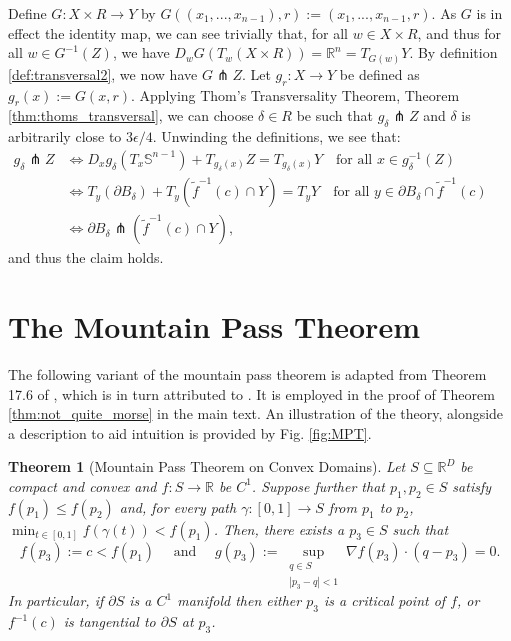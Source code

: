 \documentclass[11pt]{article}
\newcommand{\1}{\mathbf{1}}
\newtheorem{thm}{Theorem}%
\theoremstyle{definition}
\theoremstyle{remark}
\begin{document}
Define $G:X\times R \rightarrow Y$ by $G((x_1,...,x_{n-1}),r):=(x_1,...,x_{n-1},r)$. As $G$ is in effect the identity map, we can see trivially that, for all $w \in X\times R$, and thus for all $w \in G^{-1}(Z)$, we have $D_w G\left(T_w (X \times R)\right)=\mathbb{R}^n=T_{G(w)} Y$. By definition \ref{def:transversal2}, we now have $G\pitchfork Z$. Let $g_r:X\rightarrow Y$ be defined as $g_r(x):=G(x,r)$. Applying Thom's Transversality Theorem, Theorem \ref{thm:thoms_transversal}, we can choose $\delta\in R$ be such that $g_\delta \pitchfork Z$ and $\delta$ is arbitrarily close to $3\epsilon/4$. Unwinding the definitions, we see that:
\begin{equation}\nonumber
\begin{aligned}
g_\delta \pitchfork Z 
&\iff D_x g_\delta(T_x \mathbb{S}^{n-1}) + T_{g_\delta(x)} Z = T_{g_\delta(x)} Y \quad \text{for all } x \in g_\delta^{-1}(Z)
\quad && \\
&\iff T_y(\partial B_\delta) + T_y(\tilde{f}^{-1}(c) \cap Y) = T_y Y 
\quad  \text{for all } y \in \partial B_\delta \cap \tilde{f}^{-1}(c)  && \\
&\iff \partial B_\delta \pitchfork \left( \tilde{f}^{-1}(c) \cap Y \right),
\quad && 
\end{aligned}
\end{equation}
and thus the claim holds.


\section{The Mountain Pass Theorem}\label{app:mpt}


The following variant of the mountain pass theorem is adapted from Theorem 17.6 of \cite{Jabri_2003}, which is in turn attributed to \cite{convex_mpt}. It is employed in the proof of Theorem \ref{thm:not_quite_morse} in the main text. An illustration of the theory, alongside a description to aid intuition is provided by Fig. \ref{fig:MPT}. 

\begin{mdframed}
    \begin{thm}[Mountain Pass Theorem on Convex Domains]\label{thm:mpt} Let $S\subseteq\mathbb{R}^D$ be compact and convex and $f:S\rightarrow \mathbb{R}$ be $C^1$. Suppose further that $p_1, p_2 \in S$ satisfy $f(p_1) \leq f(p_2)$ and, for every path $\gamma:[0,1]\rightarrow S$ from $p_1$ to $p_2$, $\min_{t \in [0,1]} f(\gamma(t)) < f(p_1)$. Then, there exists a $p_3 \in S$ such that
\begin{equation}\nonumber
    f(p_3):= c < f(p_1)\quad  \text{ and }\quad g(p_3) := \sup_{\substack{q \in S\\ |p_3-q|<1}} \nabla f(p_3)\cdot (q-p_3) = 0 .
\end{equation}
In particular, if $\partial S$ is a $C^1$ manifold then either $p_3$ is a critical point of $f$, or $f^{-1}(c)$ is tangential to $\partial S$ at $p_3$.
    \end{thm}
\end{mdframed}
\end{document}
